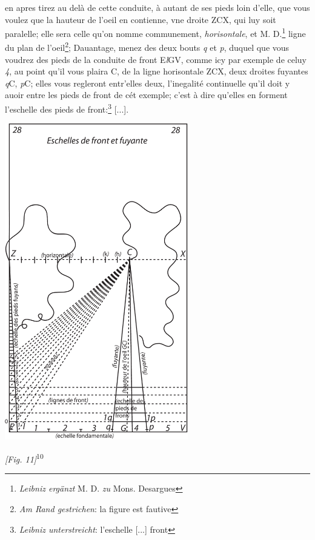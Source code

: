 \protect\clearpage
\pstart [p.~86] [...] en apres tirez au del\`{a} de cette conduite, \`{a} autant de ses pieds loin d'elle, que vous voulez que la hauteur de l'oeil\protect{} en contienne, vne droite ZCX, qui luy soit paralelle; elle sera celle qu'on nomme communement, \textit{horisontale}, et M. D.\footnote{\textit{Leibniz erg\"{a}nzt} M. D. \textit{zu} Mons. Desargues} ligne du plan de l'oeil\protect{}\footnote{\textit{Am Rand gestrichen}: la figure est fautive}; Dauantage, menez des deux bouts \textit{q} et \textit{p}, duquel que vous voudrez des pieds de la conduite de front E\textit{l}GV, comme icy par exemple de celuy \textit{4}, au point qu'il vous plaira C, de la ligne horisontale ZCX, deux droites fuyantes \textit{q}C, \textit{p}C; elles vous regleront entr'elles deux, l'inegalit\'{e} continuelle qu'il doit y auoir entre les pieds de front de c\'{e}t exemple; c'est \`{a} dire qu'elles en forment l'eschelle des pieds de front:\footnote{\textit{Leibniz unterstreicht}: l'eschelle [...] front} [...].\pend
\protect\clearpage
\begin{center}
\includegraphics[width=0.6\textwidth]{images/T28-Desargues}
\\\rule[-4mm]{0mm}{10mm}\textit{[Fig. 11]}\textsuperscript{10}\\
\end{center}
